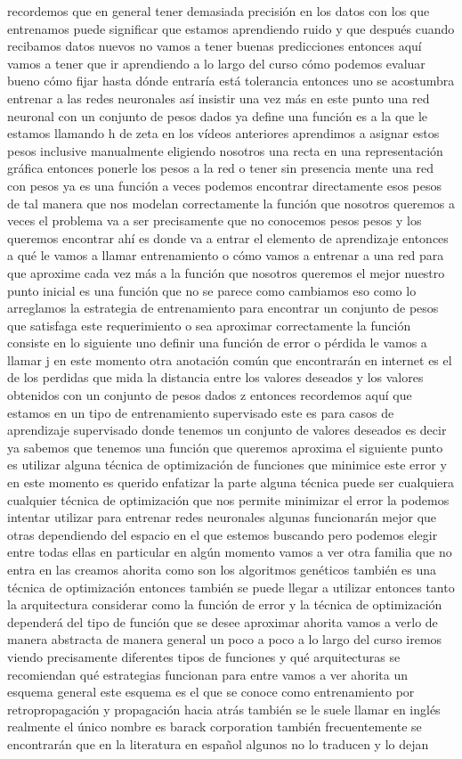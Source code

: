 recordemos que en general tener demasiada precisión en los datos con los que entrenamos puede significar que estamos aprendiendo ruido y que después cuando recibamos datos nuevos no vamos a tener buenas predicciones entonces aquí vamos a tener que ir aprendiendo a lo largo del curso cómo podemos evaluar bueno cómo fijar hasta dónde entraría está tolerancia entonces uno se acostumbra entrenar a las redes neuronales así insistir una vez más en este punto una red neuronal con un conjunto de pesos dados ya define una función es a la que le estamos llamando h de zeta en los vídeos anteriores aprendimos a asignar estos pesos inclusive manualmente eligiendo nosotros una recta en una representación gráfica entonces ponerle los pesos a la red o tener sin presencia mente una red con pesos ya es una función a veces podemos encontrar directamente esos pesos de tal manera que nos modelan correctamente la función que nosotros queremos a veces el problema va a ser precisamente que no conocemos pesos pesos y los queremos encontrar ahí es donde va a entrar el elemento de aprendizaje entonces a qué le vamos a llamar entrenamiento o cómo vamos a entrenar a una red para que aproxime cada vez más a la función que nosotros queremos el mejor nuestro punto inicial es una función que no se parece como cambiamos eso como lo arreglamos la estrategia de entrenamiento para encontrar un conjunto de pesos que satisfaga este requerimiento o sea aproximar correctamente la función consiste en lo siguiente uno definir una función de error o pérdida le vamos a llamar j en este momento otra anotación común que encontrarán en internet es el de los perdidas que mida la distancia entre los valores deseados y los valores obtenidos con un conjunto de pesos dados z entonces recordemos aquí que estamos en un tipo de entrenamiento supervisado este es para casos de aprendizaje supervisado donde tenemos un conjunto de valores deseados es decir ya sabemos que tenemos una función que queremos aproxima el siguiente punto es utilizar alguna técnica de optimización de funciones que minimice este error y en este momento es querido enfatizar la parte alguna técnica puede ser cualquiera cualquier técnica de optimización que nos permite minimizar el error la podemos intentar utilizar para entrenar redes neuronales algunas funcionarán mejor que otras dependiendo del espacio en el que estemos buscando pero podemos elegir entre todas ellas en particular en algún momento vamos a ver otra familia que no entra en las creamos ahorita como son los algoritmos genéticos también es una técnica de optimización entonces también se puede llegar a utilizar entonces tanto la arquitectura considerar como la función de error y la técnica de optimización dependerá del tipo de función que se desee aproximar ahorita vamos a verlo de manera abstracta de manera general un poco a poco a lo largo del curso iremos viendo precisamente diferentes tipos de funciones y qué arquitecturas se recomiendan qué estrategias funcionan para entre vamos a ver ahorita un esquema general este esquema es el que se conoce como entrenamiento por retropropagación y propagación hacia atrás también se le suele llamar en inglés realmente el único nombre es barack corporation también frecuentemente se encontrarán que en la literatura en español algunos no lo traducen y lo dejan 